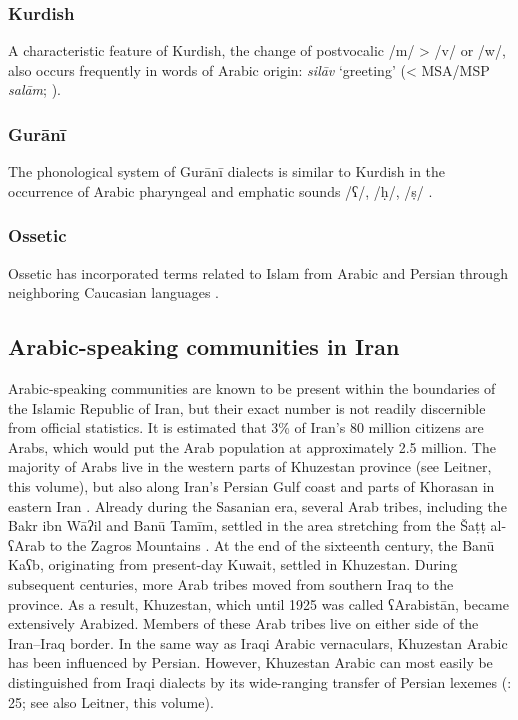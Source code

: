 \documentclass[output=paper]{langsci/langscibook}
\begin{document}
\subsubsection{Kurdish}

A characteristic feature of Kurdish, the change of postvocalic /m/ > /v/ or /w/, also occurs frequently in words of Arabic origin: \textit{silāv} ‘greeting’ (< MSA/MSP \textit{salām}; \citealt{Paul2008}).

\subsubsection{Gurānī}

The phonological system of Gurānī dialects is similar to Kurdish in the occurrence of Arabic pharyngeal and emphatic sounds /ʕ/, /ḥ/, /ṣ/ \citep{MacKenzie2012}.

\subsubsection{Ossetic}
Ossetic has incorporated terms related to Islam from Arabic and Persian through neighboring Caucasian languages \citep{Thordarson2009}.

\subsection{Arabic-speaking communities in Iran}
Arabic-speaking communities are known to be present within the boundaries of the Islamic Republic of Iran, but their exact number is not readily discernible from official statistics. It is estimated that 3\% of Iran’s 80 million citizens are Arabs, which would put the Arab population at approximately 2.5 million. The majority of Arabs live in the western parts of Khuzestan province (see Leitner, this volume), but also along Iran’s Persian Gulf coast and parts of Khorasan in eastern Iran \citep{Oberling2011}. Already during the Sasanian era, several Arab tribes, including the Bakr ibn Wāʔil and Banū Tamīm, settled in the area stretching from the Šaṭṭ al-ʕArab to the Zagros Mountains \citep{Daniel2011}. At the end of the sixteenth century, the Banū Kaʕb, originating from present-day Kuwait, settled in Khuzestan. During subsequent centuries, more Arab tribes moved from southern Iraq to the province. As a result, Khuzestan, which until 1925 was called ʕArabistān, became extensively Arabized. Members of these Arab tribes live on either side of the Iran–Iraq border. In the same way as Iraqi Arabic vernaculars, Khuzestan Arabic has been influenced by Persian. However, Khuzestan Arabic can most easily be distinguished from Iraqi dialects by its wide-ranging transfer of Persian lexemes (\citealt{Ingham1997}: 25; see also Leitner, this volume).
\end{document}
